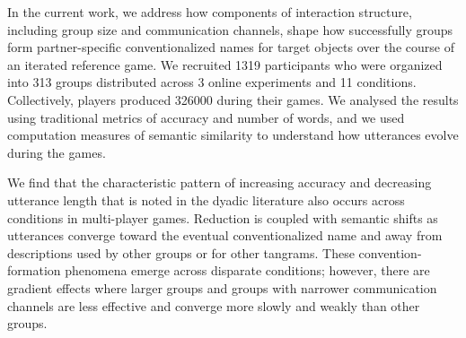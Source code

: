 \documentclass[
  english,
  a4paper,
]{article}
\begin{document}
In the current work, we address how components of interaction structure, including group size and communication channels, shape how successfully groups form partner-specific conventionalized names for target objects over the course of an iterated reference game. We recruited 1319 participants who were organized into 313 groups distributed across 3 online experiments and 11 conditions. Collectively, players produced 326000 during their games. We analysed the results using traditional metrics of accuracy and number of words, and we used computation measures of semantic similarity to understand how utterances evolve during the games.

We find that the characteristic pattern of increasing accuracy and decreasing utterance length that is noted in the dyadic literature also occurs across conditions in multi-player games. Reduction is coupled with semantic shifts as utterances converge toward the eventual conventionalized name and away from descriptions used by other groups or for other tangrams. These convention-formation phenomena emerge across disparate conditions; however, there are gradient effects where larger groups and groups with narrower communication channels are less effective and converge more slowly and weakly than other groups.
\end{document}
